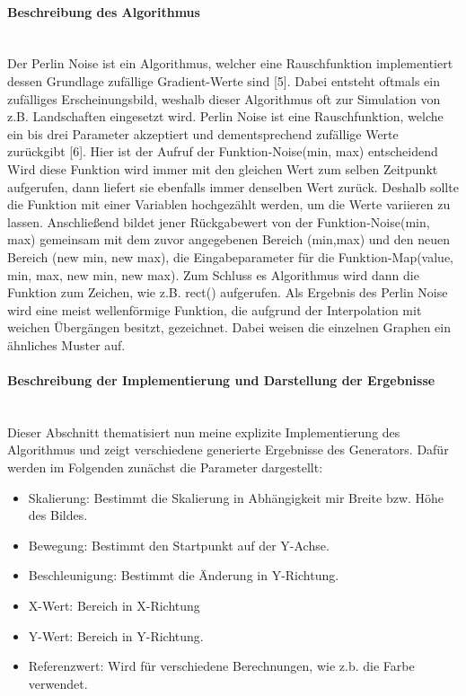\documentclass[../mciAusarbeitung.tex]{subfiles}
\begin{document}
            \paragraph{Beschreibung des Algorithmus}$~$ \\
            Der Perlin Noise ist ein Algorithmus, welcher eine Rauschfunktion implementiert dessen Grundlage zufällige Gradient-Werte sind [5]. Dabei entsteht oftmals ein zufälliges Erscheinungsbild, weshalb dieser Algorithmus oft zur Simulation von z.B. Landschaften eingesetzt wird.
            Perlin Noise ist eine Rauschfunktion, welche ein bis drei Parameter akzeptiert und dementsprechend zufällige Werte zurückgibt [6]. Hier ist der Aufruf der Funktion-Noise(min, max) entscheidend Wird diese Funktion wird immer mit den gleichen Wert zum selben Zeitpunkt aufgerufen, dann liefert sie ebenfalls immer denselben Wert zurück. Deshalb sollte die Funktion mit einer Variablen hochgezählt werden, um die Werte variieren zu lassen.
            Anschließend bildet jener Rückgabewert von der Funktion-Noise(min, max)  gemeinsam mit dem zuvor angegebenen Bereich (min,max)  und den neuen Bereich (new min, new max), die Eingabeparameter für die Funktion-Map(value, min, max, new min, new max). Zum Schluss es Algorithmus wird dann die Funktion zum Zeichen, wie z.B. rect() aufgerufen. 
            Als Ergebnis des Perlin Noise wird eine meist wellenförmige Funktion, die aufgrund der Interpolation mit weichen Übergängen besitzt, gezeichnet. Dabei weisen die einzelnen Graphen ein ähnliches Muster auf.
            
            \paragraph{Beschreibung der Implementierung und Darstellung der Ergebnisse}$~$ \\
            Dieser Abschnitt thematisiert nun meine explizite Implementierung des Algorithmus und zeigt verschiedene generierte Ergebnisse des Generators. Dafür werden im Folgenden zunächst die Parameter dargestellt:
            
            
            \begin{itemize}
\item Skalierung:	Bestimmt die Skalierung in Abhängigkeit mir Breite bzw. Höhe des Bildes.
 \item Bewegung:	Bestimmt den Startpunkt auf der Y-Achse.
 \item Beschleunigung:	Bestimmt die Änderung in Y-Richtung.
 \item X-Wert:	Bereich in X-Richtung
 \item Y-Wert:	Bereich in Y-Richtung.
 \item Referenzwert: Wird für verschiedene Berechnungen, wie z.b. die Farbe verwendet.
\end{itemize}
\end{document}
